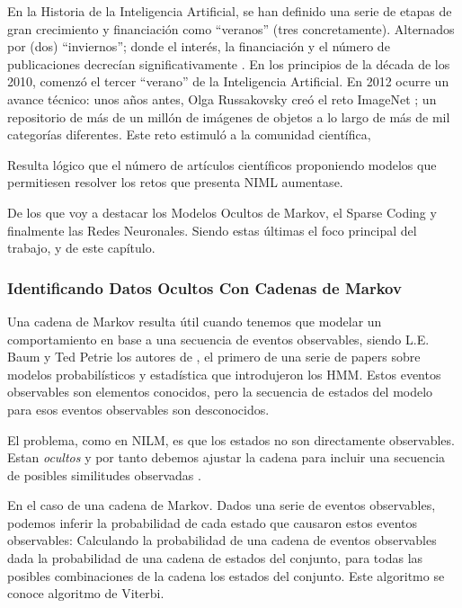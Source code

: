 En la Historia de la Inteligencia Artificial, se han definido una serie de etapas de gran crecimiento y financiación como  \foreignquote{spanish}{veranos} (tres concretamente). Alternados por (dos) \foreignquote{spanish}{inviernos}; donde el interés, la financiación y el número de publicaciones decrecían significativamente \autocite{briefAIHistory}.
En los principios de la década de los 2010, comenzó el tercer \enquote{verano} de la Inteligencia Artificial. En 2012 ocurre un avance técnico: unos años antes, Olga Russakovsky creó el reto ImageNet \autocite{ImageNetRussakovsky}; un repositorio de más de un millón de imágenes de objetos a lo largo de más de mil categorías diferentes. 
Este reto estimuló a la comunidad científica, 

Resulta lógico que el número de artículos científicos proponiendo modelos que permitiesen resolver los retos que presenta NIML aumentase.


De los que voy a destacar los Modelos Ocultos de Markov, el Sparse Coding y finalmente las Redes Neuronales. Siendo estas últimas el foco principal del trabajo, y de este capítulo. 



\subsubsection{Identificando Datos Ocultos Con Cadenas de Markov}
Una cadena de Markov resulta útil cuando tenemos que modelar un comportamiento en base a una secuencia de eventos observables, siendo L.E. Baum y Ted Petrie los autores de \autocite{introductorHMM}, el primero de una serie de papers sobre modelos probabilísticos y estadística que introdujeron los HMM.
Estos eventos observables son elementos conocidos, pero la secuencia de estados del modelo para esos eventos observables son desconocidos. 

El problema, como en NILM, es que los estados no son directamente observables. Estan \textit{ocultos} y por tanto debemos ajustar la cadena para incluir una secuencia de posibles similitudes observadas \autocite{markovStandford}. 

En el caso de una cadena de Markov. Dados una serie de eventos observables, podemos inferir la probabilidad de cada estado que causaron estos eventos observables: Calculando la probabilidad de una cadena de eventos observables dada la probabilidad de una cadena de estados del conjunto, para todas las posibles combinaciones de la cadena los estados del conjunto. 
Este algoritmo se conoce algoritmo de Viterbi.

